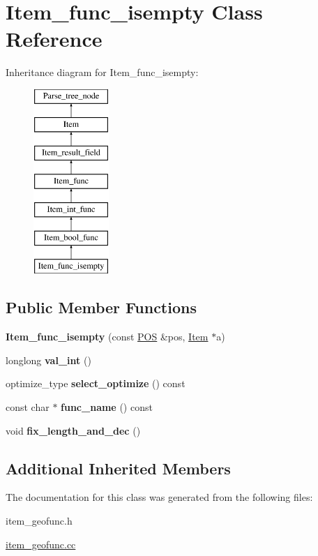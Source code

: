 \hypertarget{classItem__func__isempty}{}\section{Item\+\_\+func\+\_\+isempty Class Reference}
\label{classItem__func__isempty}
Inheritance diagram for Item\+\_\+func\+\_\+isempty\+:\begin{figure}[H]
\begin{center}
\leavevmode
\includegraphics[height=7.000000cm]{classItem__func__isempty}
\end{center}
\end{figure}
\subsection*{Public Member Functions}
\begin{DoxyCompactItemize}
\item 
\mbox{\label{classItem__func__isempty_a669412d7ca487097a675c8b99d12f570}} 
{\bfseries Item\+\_\+func\+\_\+isempty} (const \mbox{\hyperlink{structYYLTYPE}{P\+OS}} \&pos, \mbox{\hyperlink{classItem}{Item}} $\ast$a)
\item 
\mbox{\label{classItem__func__isempty_af381f88cd3ea7f2eb269bc33c4dbe7f5}} 
longlong {\bfseries val\+\_\+int} ()
\item 
\mbox{\label{classItem__func__isempty_af7ae880ef89659999f97f72b38ffc65d}} 
optimize\+\_\+type {\bfseries select\+\_\+optimize} () const
\item 
\mbox{\label{classItem__func__isempty_a35298eb60e6df94674f26c596382f695}} 
const char $\ast$ {\bfseries func\+\_\+name} () const
\item 
\mbox{\label{classItem__func__isempty_a94f5e10542b33c0137eb7e6a3b37913e}} 
void {\bfseries fix\+\_\+length\+\_\+and\+\_\+dec} ()
\end{DoxyCompactItemize}
\subsection*{Additional Inherited Members}


The documentation for this class was generated from the following files\+:\begin{DoxyCompactItemize}
\item 
item\+\_\+geofunc.\+h\item 
\mbox{\hyperlink{item__geofunc_8cc}{item\+\_\+geofunc.\+cc}}\end{DoxyCompactItemize}
